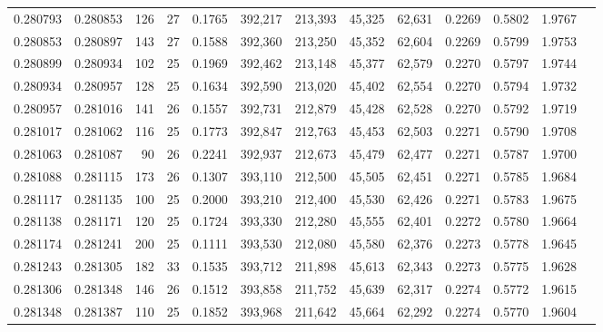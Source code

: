 \begin{tabular}{rrrrrrrrrrrrr}
0.280793 & 0.280853 &   126 &  27 &                                     0.1765 & 392,217 & 213,393 &  45,325 &  62,631 & 0.2269 & 0.5802 & 1.9767 \\
0.280853 & 0.280897 &   143 &  27 &                                     0.1588 & 392,360 & 213,250 &  45,352 &  62,604 & 0.2269 & 0.5799 & 1.9753 \\
0.280899 & 0.280934 &   102 &  25 &                                     0.1969 & 392,462 & 213,148 &  45,377 &  62,579 & 0.2270 & 0.5797 & 1.9744 \\
0.280934 & 0.280957 &   128 &  25 &                                     0.1634 & 392,590 & 213,020 &  45,402 &  62,554 & 0.2270 & 0.5794 & 1.9732 \\
0.280957 & 0.281016 &   141 &  26 &                                     0.1557 & 392,731 & 212,879 &  45,428 &  62,528 & 0.2270 & 0.5792 & 1.9719 \\
0.281017 & 0.281062 &   116 &  25 &                                     0.1773 & 392,847 & 212,763 &  45,453 &  62,503 & 0.2271 & 0.5790 & 1.9708 \\
0.281063 & 0.281087 &    90 &  26 &                                     0.2241 & 392,937 & 212,673 &  45,479 &  62,477 & 0.2271 & 0.5787 & 1.9700 \\
0.281088 & 0.281115 &   173 &  26 &                                     0.1307 & 393,110 & 212,500 &  45,505 &  62,451 & 0.2271 & 0.5785 & 1.9684 \\
0.281117 & 0.281135 &   100 &  25 &                                     0.2000 & 393,210 & 212,400 &  45,530 &  62,426 & 0.2271 & 0.5783 & 1.9675 \\
0.281138 & 0.281171 &   120 &  25 &                                     0.1724 & 393,330 & 212,280 &  45,555 &  62,401 & 0.2272 & 0.5780 & 1.9664 \\
0.281174 & 0.281241 &   200 &  25 &                                     0.1111 & 393,530 & 212,080 &  45,580 &  62,376 & 0.2273 & 0.5778 & 1.9645 \\
0.281243 & 0.281305 &   182 &  33 &                                     0.1535 & 393,712 & 211,898 &  45,613 &  62,343 & 0.2273 & 0.5775 & 1.9628 \\
0.281306 & 0.281348 &   146 &  26 &                                     0.1512 & 393,858 & 211,752 &  45,639 &  62,317 & 0.2274 & 0.5772 & 1.9615 \\
0.281348 & 0.281387 &   110 &  25 &                                     0.1852 & 393,968 & 211,642 &  45,664 &  62,292 & 0.2274 & 0.5770 & 1.9604 \\

\end{tabular}
